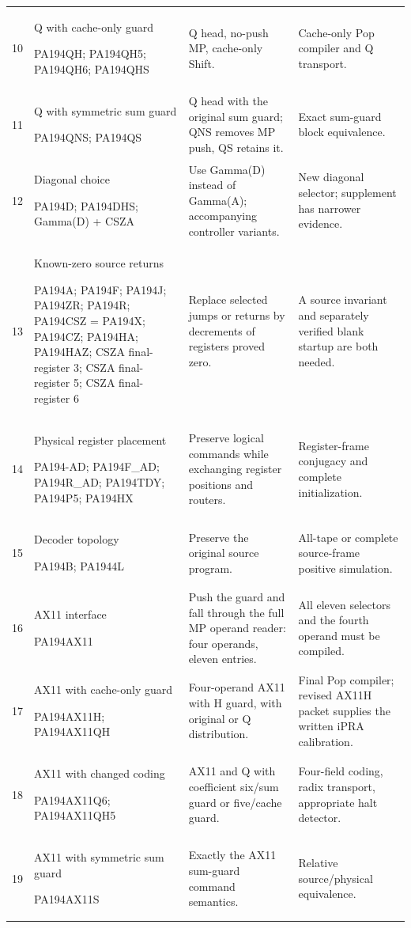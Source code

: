 \begin{longtable}{p{0.25in}>{\raggedright\arraybackslash}p{1.55in}>{\raggedright\arraybackslash}p{2.10in}>{\raggedright\arraybackslash}p{2.00in}}
10&Q with cache-only guard\par PA194QH; PA194QH5; PA194QH6; PA194QHS&Q head, no-push MP, cache-only Shift.&Cache-only Pop compiler and Q transport.\\[0.5em]
11&Q with symmetric sum guard\par PA194QNS; PA194QS&Q head with the original sum guard; QNS removes MP push, QS retains it.&Exact sum-guard block equivalence.\\[0.5em]
12&Diagonal choice\par PA194D; PA194DHS; Gamma(D) + CSZA&Use Gamma(D) instead of Gamma(A); accompanying controller variants.&New diagonal selector; supplement has narrower evidence.\\[0.5em]
13&Known-zero source returns\par PA194A; PA194F; PA194J; PA194ZR; PA194R; PA194CSZ = PA194X; PA194CZ; PA194HA; PA194HAZ; CSZA final-register 3; CSZA final-register 5; CSZA final-register 6&Replace selected jumps or returns by decrements of registers proved zero.&A source invariant and separately verified blank startup are both needed.\\[0.5em]
14&Physical register placement\par PA194-AD; PA194F\_AD; PA194R\_AD; PA194TDY; PA194P5; PA194HX&Preserve logical commands while exchanging register positions and routers.&Register-frame conjugacy and complete initialization.\\[0.5em]
15&Decoder topology\par PA194B; PA1944L&Preserve the original source program.&All-tape or complete source-frame positive simulation.\\[0.5em]
16&AX11 interface\par PA194AX11&Push the guard and fall through the full MP operand reader: four operands, eleven entries.&All eleven selectors and the fourth operand must be compiled.\\[0.5em]
17&AX11 with cache-only guard\par PA194AX11H; PA194AX11QH&Four-operand AX11 with H guard, with original or Q distribution.&Final Pop compiler; revised AX11H packet supplies the written iPRA calibration.\\[0.5em]
18&AX11 with changed coding\par PA194AX11Q6; PA194AX11QH5&AX11 and Q with coefficient six/sum guard or five/cache guard.&Four-field coding, radix transport, appropriate halt detector.\\[0.5em]
19&AX11 with symmetric sum guard\par PA194AX11S&Exactly the AX11 sum-guard command semantics.&Relative source/physical equivalence.\\[0.5em]

\end{longtable}
